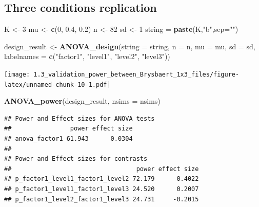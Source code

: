 \documentclass[]{article}
\newenvironment{Shaded}{\begin{snugshade}}{\end{snugshade}}
\newcommand{\KeywordTok}[1]{\textcolor[rgb]{0.13,0.29,0.53}{\textbf{#1}}}
\newcommand{\DataTypeTok}[1]{\textcolor[rgb]{0.13,0.29,0.53}{#1}}
\newcommand{\DecValTok}[1]{\textcolor[rgb]{0.00,0.00,0.81}{#1}}
\newcommand{\FloatTok}[1]{\textcolor[rgb]{0.00,0.00,0.81}{#1}}
\newcommand{\StringTok}[1]{\textcolor[rgb]{0.31,0.60,0.02}{#1}}
\newcommand{\NormalTok}[1]{#1}
\begin{document}
\subsection{Three conditions
replication}\label{three-conditions-replication-2}

\begin{Shaded}
\begin{Highlighting}[]
\NormalTok{K <-}\StringTok{ }\DecValTok{3}
\NormalTok{mu <-}\StringTok{ }\KeywordTok{c}\NormalTok{(}\DecValTok{0}\NormalTok{, }\FloatTok{0.4}\NormalTok{, }\FloatTok{0.2}\NormalTok{)}
\NormalTok{n <-}\StringTok{ }\DecValTok{82}
\NormalTok{sd <-}\StringTok{ }\DecValTok{1}
\NormalTok{string =}\StringTok{ }\KeywordTok{paste}\NormalTok{(K,}\StringTok{"b"}\NormalTok{,}\DataTypeTok{sep=}\StringTok{""}\NormalTok{)}
\end{Highlighting}
\end{Shaded}

\begin{Shaded}
\begin{Highlighting}[]
\NormalTok{design_result <-}\StringTok{ }\KeywordTok{ANOVA_design}\NormalTok{(}\DataTypeTok{string =}\NormalTok{ string,}
                   \DataTypeTok{n =}\NormalTok{ n, }
                   \DataTypeTok{mu =}\NormalTok{ mu, }
                   \DataTypeTok{sd =}\NormalTok{ sd, }
                   \DataTypeTok{labelnames =} \KeywordTok{c}\NormalTok{(}\StringTok{"factor1"}\NormalTok{, }\StringTok{"level1"}\NormalTok{, }\StringTok{"level2"}\NormalTok{, }\StringTok{"level3"}\NormalTok{))}
\end{Highlighting}
\end{Shaded}

\texttt{[image: 1.3\_validation\_power\_between\_Brysbaert\_1x3\_files/figure-latex/unnamed-chunk-10-1.pdf]}

\begin{Shaded}
\begin{Highlighting}[]
\KeywordTok{ANOVA_power}\NormalTok{(design_result, }\DataTypeTok{nsims =}\NormalTok{ nsims)}
\end{Highlighting}
\end{Shaded}

\begin{verbatim}
## Power and Effect sizes for ANOVA tests
##                power effect size
## anova_factor1 61.943      0.0304
## 
## Power and Effect sizes for contrasts
##                                  power effect size
## p_factor1_level1_factor1_level2 72.179      0.4022
## p_factor1_level1_factor1_level3 24.520      0.2007
## p_factor1_level2_factor1_level3 24.731     -0.2015
\end{verbatim}
\end{document}
